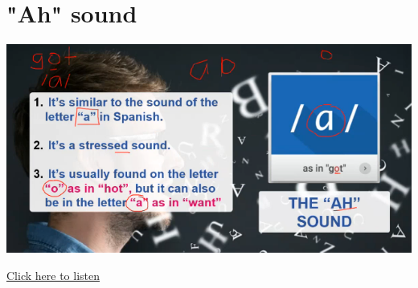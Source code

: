 \section{"Ah" sound }
\begin{center}
\includegraphics[width=1\textwidth]{images/image5.png}
\end{center}

\href{https://drive.google.com/file/d/18IaOVK4CQk8SdvJZuLdmHg19YmEYxoLD/view?usp=drive_link}{Click here to listen}

